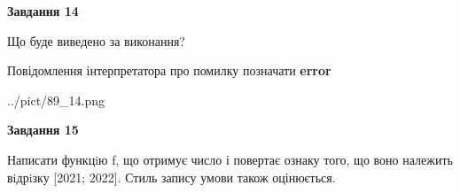 \documentclass[11pt, ukrainian]{article}
\begin{document}
{\begin {large}
{\begin {center}\textbf{Завдання 14}\end {center}}\par
Що буде виведено за виконання? \par
Повідомлення інтерпретатора про помилку позначати \textbf{error}

\begin{center}
	{../pict/89_14.png}
\end{center}
\newpage

{\begin {center}\textbf{Завдання 15}\end {center}}\par

Написати функцiю f, що отримує число і повертає ознаку того, що воно належить вiдрiзку [2021; 2022]. Стиль запису умови також оцінюється.\par
\newpage

\end {large}}
\end{document}
